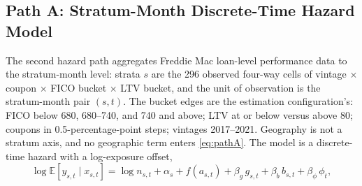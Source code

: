 \documentclass[12pt]{article}
\begin{document}
\subsection{Path A: Stratum-Month Discrete-Time Hazard Model}\label{sec:patha}

The second hazard path aggregates Freddie Mac loan-level performance data to the stratum-month level: strata $s$ are the 296 observed four-way cells of vintage $\times$ coupon $\times$ FICO bucket $\times$ LTV bucket, and the unit of observation is the stratum-month pair $(s,t)$. The bucket edges are the estimation configuration's: FICO below 680, 680--740, and 740 and above; LTV at or below versus above 80; coupons in 0.5-percentage-point steps; vintages 2017--2021. Geography is not a stratum axis, and no geographic term enters \eqref{eq:pathA}. The model is a discrete-time hazard with a log-exposure offset,
\begin{equation}\label{eq:pathA}
\log \mathbb{E}\!\left[y_{s,t} \mid x_{s,t}\right] = \log n_{s,t} + \alpha_{s} + f\!\left(a_{s,t}\right) + \beta_g\, g_{s,t} + \beta_b\, b_{s,t} + \beta_\phi\, \phi_t ,
\end{equation}
\end{document}
